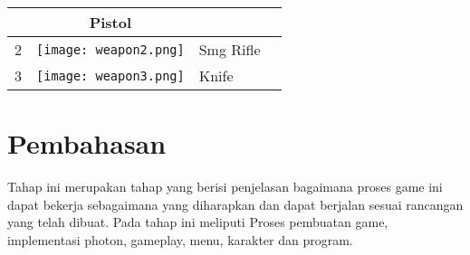 \begin{enumerate}
\begin{table}[h!]
\begin{tabular}{ | c | c | m{6cm} | m{6cm} | }
\begin{minipage}{.2\textwidth}
            \end{minipage}
            &
            \begin{minipage}{6cm}
                Pistol
            \end{minipage}
            \\ \hline
            2 &
        \begin{minipage}{.2\textwidth}
            \texttt{[image: weapon2.png]}
        \end{minipage}
        &
        \begin{minipage}{6cm}
            Smg Rifle
        \end{minipage}
        \\ \hline
        3 &
        \begin{minipage}{.2\textwidth}
            \texttt{[image: weapon3.png]}
        \end{minipage}
        &
        \begin{minipage}{6cm}
            Knife
        \end{minipage}
        \\ \hline
        \end{tabular}
    \end{table}
\end{enumerate}

\section{Pembahasan}
\noindent

Tahap ini merupakan tahap yang berisi penjelasan bagaimana proses game ini dapat bekerja sebagaimana yang diharapkan dan dapat berjalan sesuai rancangan yang telah dibuat. Pada tahap ini meliputi Proses pembuatan game, implementasi photon, gameplay, menu, karakter dan program.

